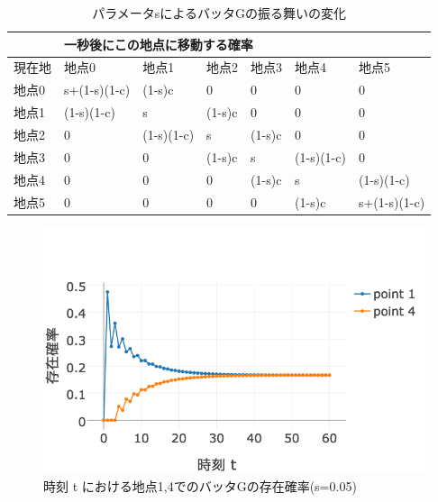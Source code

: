 \documentclass[11pt]{ltjsarticle}
\begin{document}
\begin{table}[]
\centering
\begin{tabular}{|l|l|l|l|l|l|l|}
\hline
    & \multicolumn{6}{l|}{一秒後にこの地点に移動する確率}                                    \\ \hline
現在地 & 地点0          & 地点1        & 地点2    & 地点3    & 地点4        & 地点5          \\ \hline
地点0 & s+(1-s)(1-c) & (1-s)c     & 0      & 0      & 0          & 0            \\ \hline
地点1 & (1-s)(1-c)   & s          & (1-s)c & 0      & 0          & 0            \\ \hline
地点2 & 0            & (1-s)(1-c) & s      & (1-s)c & 0          & 0            \\ \hline
地点3 & 0            & 0          & (1-s)c & s      & (1-s)(1-c) & 0            \\ \hline
地点4 & 0            & 0          & 0      & (1-s)c & s          & (1-s)(1-c)   \\ \hline
地点5 & 0            & 0          & 0      & 0      & (1-s)c     & s+(1-s)(1-c) \\ \hline
\end{tabular}
\caption{パラメータsによるバッタGの振る舞いの変化}
\end{table}

\begin{figure}
  \includegraphics[width=\textwidth]{fig1.png}
  \caption{時刻 t における地点1,4でのバッタGの存在確率(s=0.05)}
\end{figure}
\end{document}
